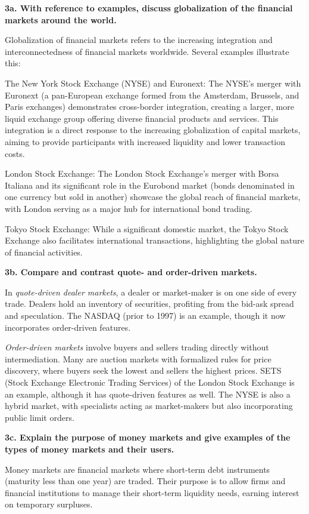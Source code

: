 \documentclass[twoside,openany]{book}
\begin{document}
\textbf{3a. With reference to examples, discuss globalization of the financial markets around the world.}

Globalization of financial markets refers to the increasing integration and interconnectedness of financial markets worldwide. Several examples illustrate this:

The New York Stock Exchange (NYSE) and Euronext: The NYSE's merger with Euronext (a pan-European exchange formed from the Amsterdam, Brussels, and Paris exchanges) demonstrates cross-border integration, creating a larger, more liquid exchange group offering diverse financial products and services. This integration is a direct response to the increasing globalization of capital markets, aiming to provide participants with increased liquidity and lower transaction costs.

London Stock Exchange: The London Stock Exchange's merger with Borsa Italiana and its significant role in the Eurobond market (bonds denominated in one currency but sold in another) showcase the global reach of financial markets, with London serving as a major hub for international bond trading.

Tokyo Stock Exchange: While a significant domestic market, the Tokyo Stock Exchange also facilitates international transactions, highlighting the global nature of financial activities.

\textbf{3b. Compare and contrast quote- and order-driven markets.}

In \textit{quote-driven dealer markets}, a dealer or market-maker is on one side of every trade. Dealers hold an inventory of securities, profiting from the bid-ask spread and speculation. The NASDAQ (prior to 1997) is an example, though it now incorporates order-driven features.

\textit{Order-driven markets} involve buyers and sellers trading directly without intermediation. Many are auction markets with formalized rules for price discovery, where buyers seek the lowest and sellers the highest prices. SETS (Stock Exchange Electronic Trading Services) of the London Stock Exchange is an example, although it has quote-driven features as well. The NYSE is also a hybrid market, with specialists acting as market-makers but also incorporating public limit orders.

\textbf{3c. Explain the purpose of money markets and give examples of the types of money markets and their users.}

Money markets are financial markets where short-term debt instruments (maturity less than one year) are traded. Their purpose is to allow firms and financial institutions to manage their short-term liquidity needs, earning interest on temporary surpluses.
\end{document}
